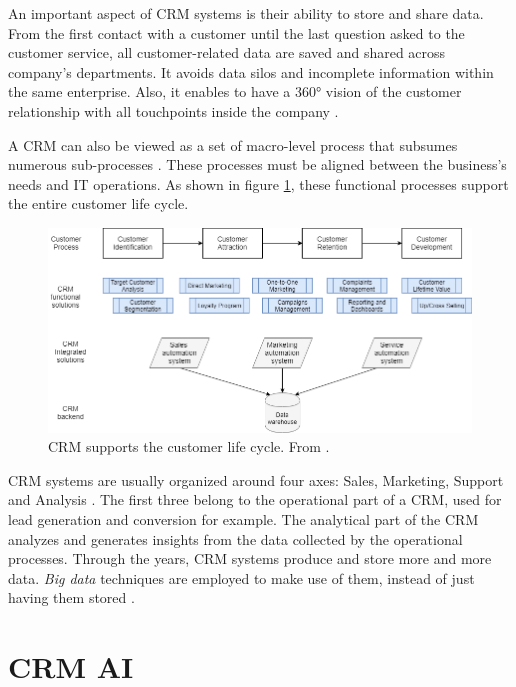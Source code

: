 An important aspect of CRM systems is their ability to store and share data. From the first contact with a customer until the last question asked to the customer service, all customer-related data are saved and shared across company's departments. It avoids data silos and incomplete information within the same enterprise. Also, it enables to have a 360° vision of the customer relationship with all touchpoints inside the company \cite{efficy-crm}.

A CRM can also be viewed as a set of macro-level process that subsumes numerous sub-processes \cite{crm-processes}. These processes must be aligned between the business's needs and IT operations. As shown in figure \ref{fig:crm-clc}, these functional processes support the entire customer life cycle.

\begin{figure}[h]
    \centering
    \includegraphics[width=13.5cm]{images/CRM-CustomerLifeCycle.png}
    \caption[CRM supports the customer life cycle]{CRM supports the customer life cycle. From \cite{DataAnalyticsinCRMProcessesALiteratureReview}.}
    \label{fig:crm-clc}
\end{figure}

CRM systems are usually organized around four axes: Sales, Marketing, Support and Analysis \cite{crm-def}. The first three belong to the operational part of a CRM, used for lead generation and conversion for example. The analytical part of the CRM analyzes and generates insights from the data collected by the operational processes. Through the years, CRM systems produce and store more and more data. \textit{Big data} techniques are employed to make use of them, instead of just having them stored \cite{peel-et-al}.


\section{CRM AI} \label{sec:crm-ai}

